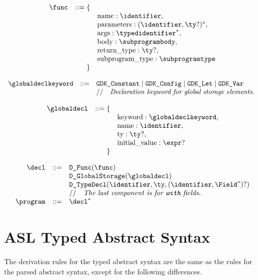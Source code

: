 \documentclass{book}
\begin{document}
\[
\begin{array}{rrl}
\func &::= \{& \\
 & & \text{name} : \identifier, \\
 & & \text{parameters} : (\identifier, \ty?)^*,\\
 & & \text{args} : \typedidentifier^*,\\
 & & \text{body} : \subprogrambody,\\
 & & \text{return\_type} : \ty?,\\
 & & \text{subprogram\_type} : \subprogramtype\\
 & \} &
\end{array}
\]

\[
\begin{array}{rcl}
\globaldeclkeyword &::=& \texttt{GDK\_Constant} \;|\; \texttt{GDK\_Config} \;|\; \texttt{GDK\_Let} \;|\; \texttt{GDK\_Var}\\
  & & \ASTComment{Declaration keyword for global storage elements.}\\
\end{array}
\]

\[
\begin{array}{rrl}
\globaldecl &::= \{& \\
 & & \text{keyword} : \globaldeclkeyword, \\
 & & \text{name} : \identifier,\\
 & & \text{ty} : \ty?,\\
 & & \text{initial\_value} : \expr?\\
 & \} &
\end{array}
\]

\[
\begin{array}{rcl}
\decl &::=& \texttt{D\_Func}(\func)\\
  & & \texttt{D\_GlobalStorage}(\globaldecl)\\
  & & \texttt{D\_TypeDecl}(\identifier, \ty, (\identifier, \Field^*)?)\\
  & & \ASTComment{The last component is for \texttt{with} fields.}\\
\program &::=& \decl^*\\
\end{array}
\]

\section{ASL Typed Abstract Syntax}

The derivation rules for the typed abstract syntax are the same as the rules for the parsed abstract syntax,
except for the following differences.
\end{document}
